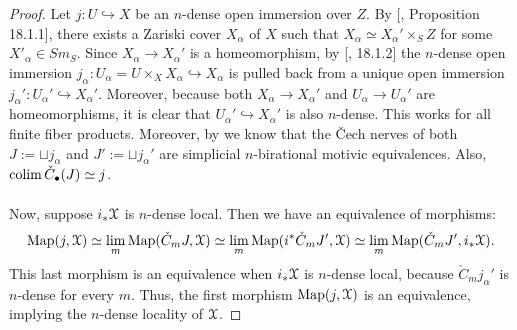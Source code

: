 \begin{proof}
    Let $j: U\hookrightarrow X$ be an $n$-dense open immersion over $Z$. By [\cite{grothendieck1966elements}, Proposition 18.1.1], there exists a Zariski cover $X_\alpha$ of $X$ such that $X_\alpha \simeq X_\alpha'\times_SZ$ for some $X'_\alpha\in Sm_S$. Since $X_\alpha\to X_\alpha'$ is a homeomorphism, by [\cite{grothendieck1966elements}, 18.1.2] the $n$-dense open immersion $j_\alpha :U_\alpha=U\times_XX_\alpha\hookrightarrow X_\alpha$ is pulled back from a unique open immersion $j_\alpha':U_\alpha'\hookrightarrow X_\alpha'$. Moreover, because both $X_\alpha\to X_\alpha'$ and $U_\alpha\to U_\alpha'$ are homeomorphisms, it is clear that $U_\alpha'\hookrightarrow X_\alpha'$ is also $n$-dense. This works for all finite fiber products. Moreover, by  we know that the \v{C}ech nerves of both $J:=\sqcup j_\alpha$ and $J':=\sqcup j_\alpha'$ are simplicial $n$-birational motivic equivalences. Also, $\mathop{\mathrm{colim}}\limits_{}\check{C}_\bullet (J)\simeq j$. 

    Now, suppose $i_*\EuScript{X}$ is $n$-dense local. Then we have an equivalence of morphisms: $$\mathrm{Map}(j,\EuScript{X})\simeq \lim_m \mathrm{Map} (\check{C} _mJ,\EuScript{X})\simeq \lim_m \mathrm{Map}(i^*\check{C} _mJ', \EuScript{X})\simeq \lim_m \mathrm{Map}(\check{C}_mJ', i_*\EuScript{X}).$$ This last morphism is an equivalence when $i_*\EuScript{X}$ is $n$-dense local, because $\check{C}_m j_\alpha'$ is $n$-dense for every $m$. Thus, the first morphism $\mathrm{Map}(j,\EuScript{X})$ is an equivalence, implying the $n$-dense locality of $\EuScript{X}$.
    \end{proof}

